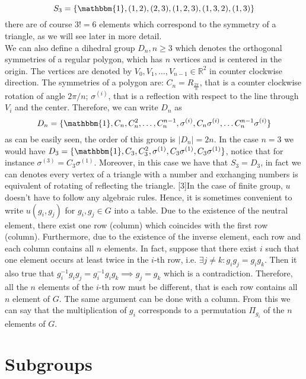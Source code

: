 \documentclass[12pt]{book}
\theoremstyle{plain}
\newcommand{\R}{\mathbb{R}}
\newcommand{\I}{\mathbbm{1}}
\theoremstyle{definition}
\theoremstyle{remark}
\begin{document}
\[S_3 = \{\I,(1,2),(2,3),(1,2,3),(1,3,2),(1,3)\}\]
there are of course $3!=6$ elements which correspond to the symmetry of a triangle, as we will see later in more detail.\\ 
We can also define a dihedral group $D_n,n\geq 3$ which denotes the orthogonal symmetries of a regular polygon, which has $n$ vertices and is centered in the origin. The vertices are denoted by $V_0,V_1,\dots,V_{n-1}\in\R^2$ in counter clockwise direction. The symmetries of a polygon are: $C_n = R_{\frac{2\pi}{n}}$, that is a counter clockwise rotation of angle $2\pi/n$; $\sigma^{(i)}$, that is a reflection with respect to the line through $V_i$ and the center. Therefore, we can write $D_n$ as
\[D_n = \{\I, C_n,C_n^2,\dots,C_n^{n-1},\sigma^{(i)},C_n\sigma^{(i)},\dots C_n^{n-1}\sigma^{(i)} \}\]
as can be easily seen, the order of this group is $|D_n| = 2n$. In the case $n=3$ we would have $D_3 = \{\I,C_3,C_3^2,\sigma^{(1)},C_3\sigma^{(1)},C_3\sigma^{(1)}\}$, notice that for instance $\sigma^{(3)} = C_3 \sigma^{(1)}$. Moreover, in this case we have that $S_3 = D_3$, in fact we can denotes every vertex of a triangle with a number and exchanging numbers is equivalent of rotating of reflecting the triangle.
[3]In the case of finite group, $u$ doesn't have to follow any algebraic rules. Hence, it is sometimes convenient to write $u(g_i,g_j)$ for $g_i,g_j\in G$ into a table. Due to the existence of the neutral element, there exist one row (column) which coincides with the first row (column). Furthermore, due to the existence of the inverse element, each row and each column contains all $n$ elements. In fact, suppose that there exist $i$ such that one element occurs at least twice in the $i$-th row, i.e. $\exists j\neq k : g_ig_j = g_ig_k$.  Then it also true that $g_i^{-1}g_ig_j = g_i^{-1}g_ig_k \implies g_j = g_k$ which is a contradiction. Therefore, all the $n$ elements of the $i$-th row must be different, that is each row contains all $n$ element of $G$. The same argument can be done with a column. From this we can say that the multiplication of $g_i$ corresponds to a permutation $\Pi_{g_i}$ of the $n$ elements of $G$.
\section{Subgroups}
\end{document}
